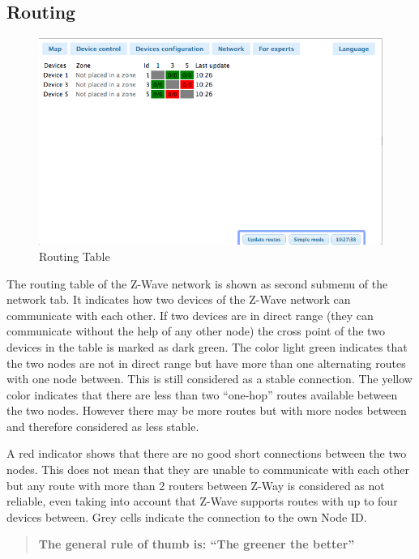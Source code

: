 \subsection{Routing}

\begin{figure} 
\begin{center}
\includegraphics[scale=0.5]{pics/routingtable.png}
\caption{Routing Table}
\end{center} 
\end{figure}
The routing table of the Z-Wave network is shown as second submenu of the network tab. It indicates how 
two devices of the Z-Wave network can 
communicate with each other. If two devices are in direct range (they can communicate without the help of 
any other node) the cross point of the two devices in the table is marked as dark green. The color 
light green indicates that the two nodes are not in direct range but have more than one alternating 
routes with one node between. This is still considered as a stable connection.
The yellow color indicates that there are less than two “one-hop” routes available between the two 
nodes. However there may be more routes but with more nodes between and therefore considered as less stable.

A red indicator shows that there are no good short connections between the two nodes. This does not 
mean that they are unable to communicate with each other but any route with more than 2 routers 
between Z-Way is considered as not reliable, even taking into account that Z-Wave supports routes 
with up to four devices between. Grey cells indicate the connection to the own Node ID. 


\begin{quote} {\bf The general rule of thumb is: “The greener the better”} 
\end{quote}

